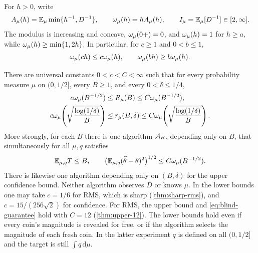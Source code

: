 For $h>0$, write
\begin{equation}\label{eq:A-I}
 A_\mu(h)=\mathbb E_\mu\min\{h^{-1},D^{-1}\},\qquad
 \omega_\mu(h)=hA_\mu(h),\qquad I_\mu=\mathbb E_\mu[D^{-1}]\in[2,\infty].
\end{equation}
The modulus is increasing and concave, $\omega_\mu(0+)=0$, and $\omega_\mu(h)=1$ for
$h\ge a$, while $\omega_\mu(h)\ge\min\{1,2h\}$. In particular, for $c\ge1$ and $0<b\le1$,
\begin{equation}\label{eq:scaling}
 \omega_\mu(ch)\le c\omega_\mu(h),\qquad \omega_\mu(bh)\ge b\omega_\mu(h).
\end{equation}

\begin{theorem}\label{thm:main}
There are universal constants $0<c<C<\infty$ such that for every probability
measure $\mu$ on $(0,1/2]$, every $B\ge1$, and every $0<\delta\le1/4$,
\begin{align}
 c\omega_\mu(B^{-1/2})&\le R_\mu(B)\le C\omega_\mu(B^{-1/2}),\label{eq:main-rms}\\
 c\omega_\mu\!\left(\sqrt{\frac{\log(1/\delta)}{B}}\right)
 &\le r_\mu(B,\delta)
 \le C\omega_\mu\!\left(\sqrt{\frac{\log(1/\delta)}{B}}\right).
 \label{eq:main-conf}
\end{align}
More strongly, for each $B$ there is one algorithm $\mathcal A_B$, depending only
on $B$, that simultaneously for all $\mu,q$ satisfies
\begin{equation}\label{eq:blind-guarantee}
 \mathbb E_{\mu,q}T\le B,\qquad
 \bigl(\mathbb E_{\mu,q}(\widehat\theta-\theta)^2\bigr)^{1/2}
 \le C\omega_\mu(B^{-1/2}).
\end{equation}
There is likewise one algorithm depending only on $(B,\delta)$ for the
upper confidence bound. Neither algorithm observes $D$ or knows $\mu$.
In the lower bounds one may take $c=1/6$ for RMS, which is sharp
(\cref{thm:sharp-rms}), and $c=15/(256\sqrt2)$ for confidence.
For RMS, the upper bound and \eqref{eq:blind-guarantee} hold with
$C=12$ (\cref{thm:upper-12}).
The lower bounds hold even if every coin's magnitude is revealed for free,
or if the algorithm selects the magnitude of each fresh coin. In the latter
experiment $q$ is defined on all $(0,1/2]$ and the target is still
$\int q\,\mathrm d\mu$.
\end{theorem}

